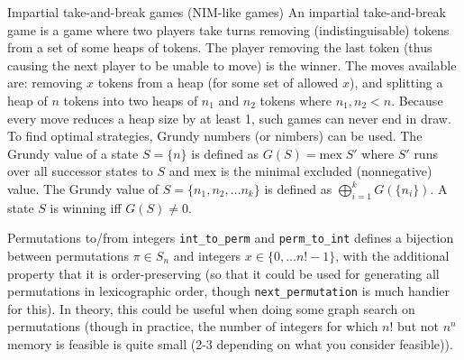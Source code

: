 \categorycontents{}



\begin{algorithm}{Impartial take-and-break games (NIM-like games)}
\desc
An impartial take-and-break game is a game where two players take
turns removing (indistinguisable) tokens from a set of some heaps of
tokens.  The player removing the last token (thus causing the next
player to be unable to move) is the winner.  The moves available are:
removing $x$ tokens from a heap (for some set of allowed $x$), and
splitting a heap of $n$ tokens into two heaps of $n_1$ and $n_2$
tokens where $n_1, n_2 < n$.  Because every move reduces a heap size
by at least 1, such games can never end in draw.  To find optimal
strategies, Grundy numbers (or nimbers) can be used.  The Grundy value
of a state $S = \{n\}$ is defined as $G(S) =
\mathrm{mex}\;S'$ where $S'$ runs over all successor states to $S$ and
$\mathrm{mex}$ is the minimal excluded (nonnegative) value.  The
Grundy value of $S =
\{n_1, n_2, \ldots n_k\}$ is defined as $\bigoplus_{i=1}^{k}
G(\{n_i\})$.  A state $S$ is winning iff $G(S) \ne 0$.

\end{algorithm}


\begin{algorithm}{Permutations to/from integers}
\desc
{\tt int\_to\_perm} and {\tt perm\_to\_int} defines a bijection
between permutations $\pi \in S_n$ and integers $x \in \{0, \ldots
n!-1\}$, with the additional property that it is order-preserving (so
that it could be used for generating all permutations in lexicographic
order, though {\tt next\_permutation} is much handier for this).  In
theory, this could be useful when doing some graph search on
permutations (though in practice, the number of integers for which
$n!$ but not $n^n$ memory is feasible is quite small (2-3 depending on
what you consider feasible)).
\end{algorithm}


\begin{sourceslandscape}

\end{sourceslandscape}
